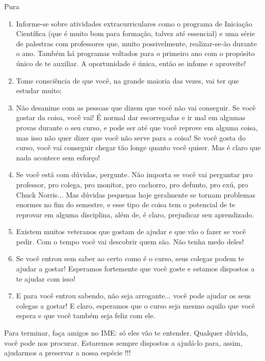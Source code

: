 \begin{subsecao}{Pura}
\begin{enumerate}
\item	Informe-se sobre atividades extracurriculares como o programa de
Iniciação Científica (que é muito bom para formação, talvez até essencial) e
uma série de palestras com professores que, muito possivelmente, realizar-se-ão
durante o ano. Também há programas voltados para o primeiro ano com o propósito único de te auxiliar. A oportunidade é única, então se infome e aproveite!
\item	Tome consciência de que você, na grande maioria das vezes, vai ter que
estudar muito;
\item	Não desanime com as pessoas que dizem que você não vai conseguir. Se você gostar da coisa, você vai! É normal dar escorregadas e ir mal em algumas provas durante o seu curso, e pode ser até que você reprove em alguma coisa, mas isso não quer dizer que você não serve para a coisa! Se você gosta do curso, você vai conseguir chegar tão longe quanto você quiser. Mas é claro que nada acontece sem esforço!
\item Se você está com dúvidas, pergunte. Não importa se você vai perguntar pro professor, pro colega, pro monitor, pro cachorro, pro defunto, pro exú, pro Chuck Norris... Mas dúvidas pequenas hoje geralmente se tornam problemas enormes no fim do semestre, e esse tipo de coisa tem o potencial de te reprovar em alguma disciplina, além de, é claro, prejudicar seu aprendizado.
\item	Existem muitos veteranos que gostam de ajudar e que vão o fazer se você pedir. Com o tempo você vai descobrir quem são. Não tenha medo deles!
\item	Se você entrou sem saber ao certo como é o curso, seus colegas podem te ajudar a gostar! Esperamos fortemente que você goste e estamos dispostos a te ajudar com isso!
\item	E para você entrou sabendo, não seja arrogante... você pode ajudar os seus colegas a gostar! E claro, esperamos que o curso seja mesmo aquilo que você espera e que você também seja feliz com ele.

\end{enumerate}
Para terminar, faça amigos no IME: só eles vão te entender. Qualquer dúvida,
você pode nos procurar. Estaremos sempre dispostos a ajudá-lo para, assim, ajudarmos a
preservar a nossa espécie !!!


\end{subsecao}
